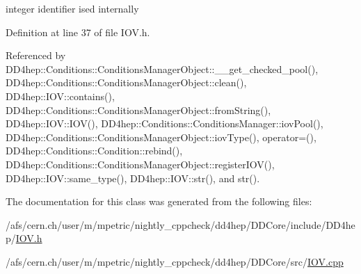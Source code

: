 integer identifier ised internally 

Definition at line 37 of file IOV.h.

Referenced by DD4hep::Conditions::ConditionsManagerObject::\_\-\_\-get\_\-checked\_\-pool(), DD4hep::Conditions::ConditionsManagerObject::clean(), DD4hep::IOV::contains(), DD4hep::Conditions::ConditionsManagerObject::fromString(), DD4hep::IOV::IOV(), DD4hep::Conditions::ConditionsManager::iovPool(), DD4hep::Conditions::ConditionsManagerObject::iovType(), operator=(), DD4hep::Conditions::Condition::rebind(), DD4hep::Conditions::ConditionsManagerObject::registerIOV(), DD4hep::IOV::same\_\-type(), DD4hep::IOV::str(), and str().

The documentation for this class was generated from the following files:\begin{DoxyCompactItemize}
\item 
/afs/cern.ch/user/m/mpetric/nightly\_\-cppcheck/dd4hep/DDCore/include/DD4hep/\hyperlink{_i_o_v_8h}{IOV.h}\item 
/afs/cern.ch/user/m/mpetric/nightly\_\-cppcheck/dd4hep/DDCore/src/\hyperlink{_i_o_v_8cpp}{IOV.cpp}\end{DoxyCompactItemize}
